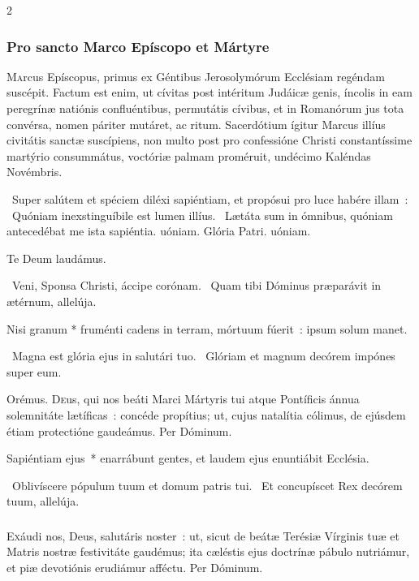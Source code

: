 \documentclass[9pt,twoside]{extarticle}
\begin{document}
\begin{multicols}{2}
\subsubsection*{\center \normalfont Pro sancto Marco Epíscopo et Mártyre\\
\small {}}
\lettrine{M}arcus Epíscopus, primus ex Géntibus Jerosolymórum Ecclésiam regéndam suscépit. Factum est enim, ut cívitas post intéritum Judáicæ genis, íncolis in eam peregrínæ natiónis confluéntibus, permutátis cívibus, et in Romanórum jus tota convérsa, nomen páriter mutáret, ac ritum. Sacerdótium ígitur Marcus illíus civitátis sanctæ suscípiens, non multo post pro confessióne Christi constantíssime martýrio consummátus, voctóriæ palmam proméruit, undécimo Kaléndas Novémbris.

~Super salútem et spéciem diléxi sapiéntiam, et propósui pro luce habére illam~: \textred{*}~Quóniam inexstinguíbile est lumen illíus. ~Lætáta sum in ómnibus, quóniam antecedébat me ista sapiéntia. uóniam. Glória Patri. uóniam.

Te Deum laudámus. %

~Veni, Sponsa Christi, áccipe corónam. ~Quam tibi Dóminus præparávit in ætérnum, allelúja.

{\small {}}

 Nisi granum * fruménti cadens in terram, mórtuum fúerit~: ipsum solum manet.

~Magna est glória ejus in salutári tuo. ~Glóriam et magnum decórem impónes super eum.
 
\smallskip
Orémus. \hfill {}
\lettrine{D}eus, qui nos beáti Marci Mártyris tui atque Pontíficis ánnua solemnitáte lætíficas~: concéde propítius; ut, cujus natalítia cólimus, de ejúsdem étiam protectióne gaudeámus. Per Dóminum.

\small {}

\normalsize
{} Sapiéntiam ejus~* enarrábunt gentes, et laudem ejus enuntiábit Ecclésia.

~Oblivíscere pópulum tuum et domum patris tui. ~Et concupíscet Rex decórem tuum, allelúja.

\subsubsection*{\center \normalfont {}}
\lettrine{E}{x}áudi nos, Deus, salutáris noster~: ut, sicut de beátæ Terésiæ Vírginis tuæ et Matris nostræ festivitáte gaudémus; ita cæléstis ejus doctrínæ pábulo nutriámur, et piæ devotiónis erudiámur afféctu. Per Dóminum.


\end{multicols}
\end{document}
